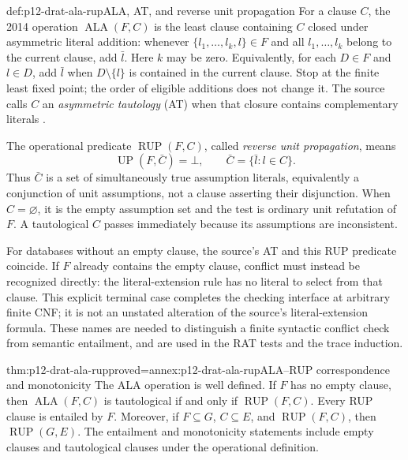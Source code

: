 \begin{hbdefinition}{def:p12-drat-ala-rup}{ALA, AT, and reverse unit propagation}
For a clause \(C\), the 2014 operation
\(\operatorname{ALA}(F,C)\) is the least clause containing \(C\) closed
under asymmetric literal addition: whenever
\(\{l_1,\ldots,l_k,l\}\in F\) and all
\(l_1,\ldots,l_k\) belong to the current clause, add \(\bar l\).
Here \(k\) may be zero.  Equivalently, for each \(D\in F\) and
\(l\in D\), add \(\bar l\) when
\(D\setminus\{l\}\) is contained in the current clause.  Stop at the
finite least fixed point; the order of eligible additions does not change it.
The source calls \(C\) an \emph{asymmetric tautology} (AT) when that
closure contains complementary literals
\cite[Def.~1]{WetzlerHeuleHunt2014AuthorDRAT}.

The operational predicate \(\operatorname{RUP}(F,C)\), called
\emph{reverse unit propagation}, means
\[
 \operatorname{UP}(F,\bar C)=\bot,
 \qquad \bar C=\{\bar l:l\in C\}.
\]
Thus \(\bar C\) is a set of simultaneously true assumption literals,
equivalently a conjunction of unit assumptions, not a clause asserting their
disjunction.  When \(C=\varnothing\), it is the empty assumption set and
the test is ordinary unit refutation of \(F\).  A tautological \(C\)
passes immediately because its assumptions are inconsistent.

For databases without an empty clause, the source's AT and this RUP predicate
coincide.  If \(F\) already contains the empty clause, conflict must instead
be recognized directly: the literal-extension rule has no literal to select
from that clause.  This explicit terminal case completes the checking
interface at arbitrary finite CNF; it is not an unstated alteration of the
source's literal-extension formula.  These names are needed to distinguish a
finite syntactic conflict check from semantic entailment, and are used in the
RAT tests and the trace induction.
\end{hbdefinition}

\begin{hblemma}{thm:p12-drat-ala-rup}{proved=annex:p12-drat-ala-rup}{ALA--RUP correspondence and monotonicity}
The ALA operation is well defined.  If \(F\) has no empty clause, then
\(\operatorname{ALA}(F,C)\) is tautological if and only if
\(\operatorname{RUP}(F,C)\).  Every RUP clause is entailed by \(F\).
Moreover, if \(F\subseteq G\), \(C\subseteq E\), and
\(\operatorname{RUP}(F,C)\), then \(\operatorname{RUP}(G,E)\).
The entailment and monotonicity statements include empty clauses and
tautological clauses under the operational definition.
\end{hblemma}

